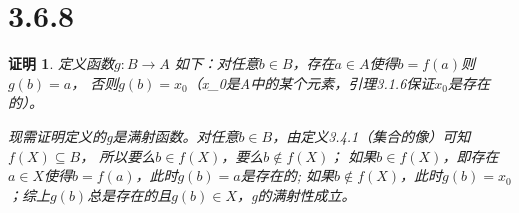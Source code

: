 \documentclass{article}
\theoremstyle{mystyle}
\theoremstyle{zproofstyle}
\newtheorem*{zproof}{证明}
\begin{document}
\section*{3.6.8}
\begin{zproof}
  定义函数$g: B \rightarrow A$
  如下：对任意$b \in B$，存在$a \in A$使得$b=f(a)$则$g(b)=a$，
  否则$g(b)=x_0$（x_0是A中的某个元素，引理3.1.6保证$x_0$是存在的）。

  现需证明定义的g是满射函数。对任意$b \in B$，由定义3.4.1（集合的像）可知$f(X) \subseteq B$，
  所以要么$b \in f(X)$，要么$b \not \in f(X)$；
  如果$b \in f(X)$，即存在$a \in X$使得$b=f(a)$，此时$g(b)=a$是存在的;
  如果$b \not \in f(X)$，此时$g(b)=x_0$；综上$g(b)$总是存在的且$g(b) \in X$，g的满射性成立。
\end{zproof}
\end{document}
